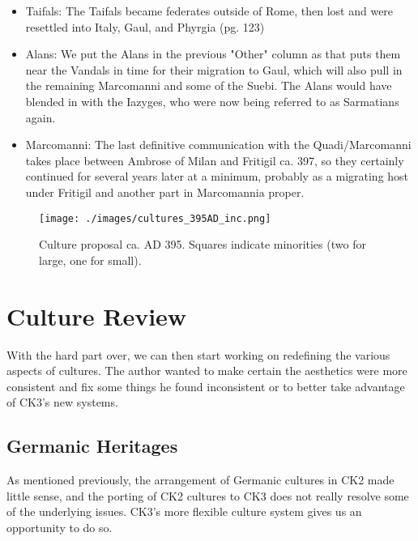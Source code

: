 \documentclass{article}
\begin{document}
\begin{itemize}
		\item Taifals:\newline
		The Taifals became federates outside of Rome, then lost and were resettled into Italy, Gaul, and Phyrgia \cite{WolframHistoryOfTheGoths} (\tiny pg. 123)\normalsize
		
		\item Alans:\newline
		We put the Alans in the previous "Other" column as that puts them near the Vandals in time for their migration to Gaul, which will also pull in the remaining Marcomanni and some of the Suebi.\newline
		The Alans would have blended in with the Iazyges, who were now being referred to as Sarmatians again.\newline
		
		\item Marcomanni:\newline
		The last definitive communication with the Quadi/Marcomanni takes place between Ambrose of Milan and Fritigil ca. 397, so they certainly continued for several years later at a minimum, probably as a migrating host under Fritigil and another part in Marcomannia proper.
	\end{itemize}
	
	\begin{figure}[h!]
		\centering
		\texttt{[image: ./images/cultures\_395AD\_inc.png]}
		\caption{Culture proposal ca. AD 395. Squares indicate minorities (two for large, one for small).}
	\end{figure}
	
	\newpage
	
	\section{Culture Review}
	\label{sec:culture_review}
	
	With the hard part over, we can then start working on redefining the various aspects of cultures.
	The author wanted to make certain the aesthetics were more consistent and fix some things he found inconsistent or to better take advantage of CK3's new systems.
	
	\subsection{Germanic Heritages}
	\label{sec:culture_review:subsec:germanic_heritages}
	As mentioned previously, the arrangement of Germanic cultures in CK2 made little sense, and the porting of CK2 cultures to CK3 does not really resolve some of the underlying issues.
	CK3's more flexible culture system gives us an opportunity to do so.
	
\end{document}

